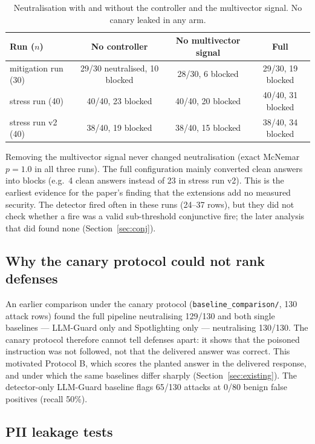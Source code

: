 \documentclass[11pt,a4paper]{article}
\begin{document}
\begin{table}[h]
\centering\small
\begin{tabular}{@{}l c c c@{}}
\toprule
Run ($n$) & No controller & No multivector signal & Full \\
\midrule
mitigation run (30) & 29/30 neutralised, 10 blocked & 28/30, 6 blocked & 29/30, 19 blocked \\
stress run (40) & 40/40, 23 blocked & 40/40, 20 blocked & 40/40, 31 blocked \\
stress run v2 (40) & 38/40, 19 blocked & 38/40, 15 blocked & 38/40, 34 blocked \\
\bottomrule
\end{tabular}
\caption{Neutralisation with and without the controller and the multivector signal. No canary leaked in any arm.}
\end{table}

Removing the multivector signal never changed neutralisation (exact McNemar $p=1.0$ in all three runs). The full
configuration mainly converted clean answers into blocks (e.g.\ 4 clean answers instead of 23 in stress run v2).
This is the earliest evidence for the paper's finding that the extensions add no measured security. The detector fired often in these runs (24--37 rows),
but they did not check whether a fire was a valid sub-threshold conjunctive fire; the later analysis that did found
none (Section~\ref{sec:conj}).

\subsection{Why the canary protocol could not rank defenses}

An earlier comparison under the canary protocol (\texttt{baseline\_comparison/}, 130 attack rows) found the full pipeline
neutralising 129/130 and both single baselines --- LLM-Guard only and Spotlighting only --- neutralising 130/130.
The canary protocol therefore cannot tell defenses apart: it shows that the poisoned instruction was not followed,
not that the delivered answer was correct. This motivated Protocol B, which scores the planted answer in the
delivered response, and under which the same baselines differ sharply (Section~\ref{sec:existing}). The detector-only LLM-Guard
baseline flags 65/130 attacks at 0/80 benign false positives (recall 50\%).

\subsection{PII leakage tests}
\end{document}
